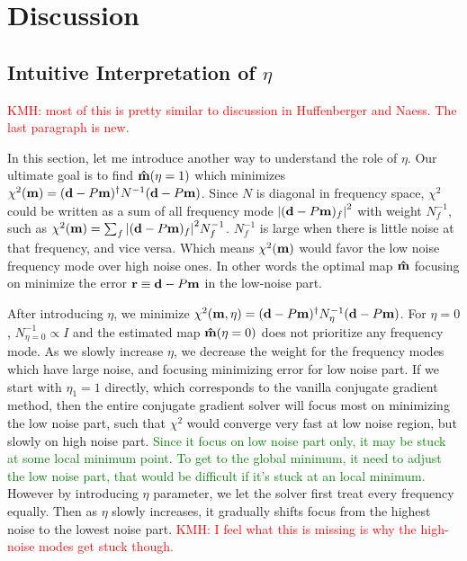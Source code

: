 \documentclass[twocolumn,linenumbers]{aastex631}
\newcommand{\vbd}{\vb{d}}
\newcommand{\vbm}{\vb{m}}
\newcommand{\inv}[1]{#1^{-1}}
\newcommand{\hatm}{\vb{\hat{m}}}
\newcommand{\kmh}[1]{\textcolor{red}{KMH: #1}}
\begin{document}
\section{Discussion} \label{sec:discussion}

\subsection{Intuitive Interpretation of $\eta$}\label{intuitive interp}

\kmh{most of this is pretty similar to discussion in Huffenberger and Naess.  The last paragraph is new.}

In this section, let me introduce another way to understand the role of $\eta$.
Our ultimate goal is to find $\hatm(\eta=1)$ which minimizes 
$\chi^2(\vbm) = (\vbd - P\vbm)^{\dagger} \inv{N} (\vbd - P\vbm)$.
Since $N$ is diagonal in frequency space,
$\chi^2$ could be written as a sum of all frequency mode 
$\qty|(\vbd-P\vbm)_f|^2$ with weight $\inv{N}_f$, such as
$\chi^2(\vbm) = \sum_f \qty|(\vbd-P\vbm)_f|^2 \inv{N}_f$.
$\inv{N}_f$ is large when there is little noise at that frequency,
and vice versa.
Which means $\chi^2(\vbm)$ would favor the low noise frequency mode over high 
noise ones.
In other words the optimal map $\hatm$ focusing on minimize the error
$\vb{r} \equiv \vbd - P\vbm$ in the low-noise part.

After introducing $\eta$, we minimize
$\chi^2(\vbm,\eta)=(\vbd-P\vbm)^{\dagger} N_{\eta}^{-1} (\vbd - P\vbm)$.
For $\eta=0$, $N^{-1}_{\eta=0} \propto I$ and the estimated map $\hatm(\eta=0)$
does not prioritize any frequency mode.
As we slowly increase $\eta$, we decrease the weight for the frequency modes
which have large noise, and focusing minimizing error for low noise part.
If we start with $\eta_1=1$ directly, which corresponds to the vanilla conjugate
gradient method, then the entire conjugate gradient solver
will focus most on minimizing the low noise part, such that $\chi^2$ would
converge very fast at low noise region, but slowly on high noise part.
\textcolor{green}{
Since it focus on low noise part only, it may be stuck at some local minimum point.
To get to the global minimum, it need to adjust the low noise part, that would
be difficult if it's stuck at an local minimum.
}
However by introducing $\eta$ parameter, we let the solver first treat every
frequency equally.
Then as $\eta$ slowly increases, it gradually shifts focus from the highest noise to the lowest noise
part.  \kmh{I feel what this is missing is why the high-noise modes get stuck though.}
\end{document}
